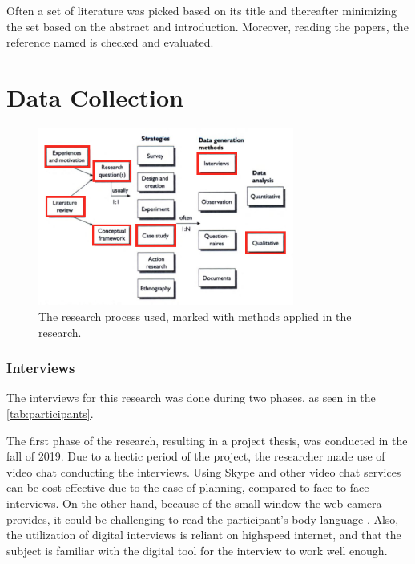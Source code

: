 Often a set of literature was picked based on its title and thereafter minimizing the set based on the abstract and introduction. Moreover, reading the papers, the reference named is checked and evaluated. 

\section{Data Collection}
\begin{figure}
    \begin{center}
        \includegraphics[width=0.75\textwidth]{fig/research_process_master.png}
        \caption{The research process used, marked with methods applied in the research.}
        \label{fig:research_process_master}
    \end{center}
\end{figure}

\subsubsection{Interviews}
The interviews for this research was done during two phases, as seen in the \ref{tab:participants}. 

The first phase of the research, resulting in a project thesis, was conducted in the fall of 2019. Due to a hectic period of the project, the researcher made use of video chat conducting the interviews. Using Skype and other video chat services can be cost-effective due to the ease of planning, compared to face-to-face interviews. On the other hand, because of the small window the web camera provides, it could be challenging to read the participant's body language \cite{cater2011skype}.  Also, the utilization of digital interviews is reliant on highspeed internet, and that the subject is familiar with the digital tool for the interview to work well enough.

